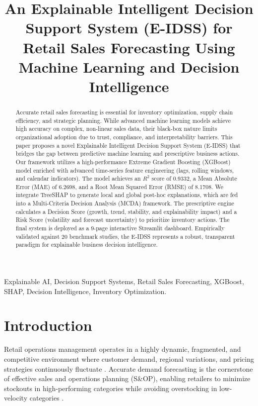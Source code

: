 \documentclass[conference]{IEEEtran}
\begin{document}
\title{An Explainable Intelligent Decision Support System (E-IDSS) for Retail Sales Forecasting Using Machine Learning and Decision Intelligence}

\author{
}

\maketitle

\begin{abstract}
Accurate retail sales forecasting is essential for inventory optimization, supply chain efficiency, and strategic planning. While advanced machine learning models achieve high accuracy on complex, non-linear sales data, their black-box nature limits organizational adoption due to trust, compliance, and interpretability barriers. This paper proposes a novel Explainable Intelligent Decision Support System (E-IDSS) that bridges the gap between predictive machine learning and prescriptive business actions. Our framework utilizes a high-performance Extreme Gradient Boosting (XGBoost) model enriched with advanced time-series feature engineering (lags, rolling windows, and calendar indicators). The model achieves an $R^2$ score of 0.9332, a Mean Absolute Error (MAE) of 6.2698, and a Root Mean Squared Error (RMSE) of 8.1708. We integrate TreeSHAP to generate local and global post-hoc explanations, which are fed into a Multi-Criteria Decision Analysis (MCDA) framework. The prescriptive engine calculates a Decision Score (growth, trend, stability, and explainability impact) and a Risk Score (volatility and forecast uncertainty) to prioritize inventory actions. The final system is deployed as a 9-page interactive Streamlit dashboard. Empirically validated against 20 benchmark studies, the E-IDSS represents a robust, transparent paradigm for explainable business decision intelligence.
\end{abstract}

\begin{IEEEkeywords}
Explainable AI, Decision Support Systems, Retail Sales Forecasting, XGBoost, SHAP, Decision Intelligence, Inventory Optimization.
\end{IEEEkeywords}

\section{Introduction}
Retail operations management operates in a highly dynamic, fragmented, and competitive environment where customer demand, regional variations, and pricing strategies continuously fluctuate \cite{tiwari2025agentic}. Accurate demand forecasting is the cornerstone of effective sales and operations planning (S\&OP), enabling retailers to minimize stockouts in high-performing categories while avoiding overstocking in low-velocity categories \cite{venkiteela2025machine}. 
\end{document}
